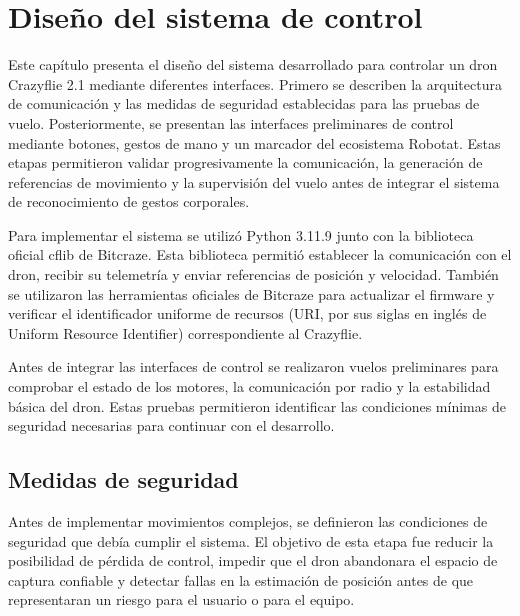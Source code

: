 
\chapter{Diseño del sistema de control}

Este capítulo presenta el diseño del sistema desarrollado para controlar un dron Crazyflie 2.1 mediante diferentes interfaces. Primero se describen la arquitectura de comunicación y las medidas de seguridad establecidas para las pruebas de vuelo. Posteriormente, se presentan las interfaces preliminares de control mediante botones, gestos de mano y un marcador del ecosistema Robotat. Estas etapas permitieron validar progresivamente la comunicación, la generación de referencias de movimiento y la supervisión del vuelo antes de integrar el sistema de reconocimiento de gestos corporales.

Para implementar el sistema se utilizó Python 3.11.9 junto con la biblioteca oficial cflib de Bitcraze. Esta biblioteca permitió establecer la comunicación con el dron, recibir su telemetría y enviar referencias de posición y velocidad. También se utilizaron las herramientas oficiales de Bitcraze para actualizar el firmware y verificar el identificador uniforme de recursos (URI, por sus siglas en inglés de Uniform Resource Identifier) correspondiente al Crazyflie.

Antes de integrar las interfaces de control se realizaron vuelos preliminares para comprobar el estado de los motores, la comunicación por radio y la estabilidad básica del dron. Estas pruebas permitieron identificar las condiciones mínimas de seguridad necesarias para continuar con el desarrollo.

\section{Medidas de seguridad}

Antes de implementar movimientos complejos, se definieron las condiciones de seguridad que debía cumplir el sistema. El objetivo de esta etapa fue reducir la posibilidad de pérdida de control, impedir que el dron abandonara el espacio de captura confiable y detectar fallas en la estimación de posición antes de que representaran un riesgo para el usuario o para el equipo.

